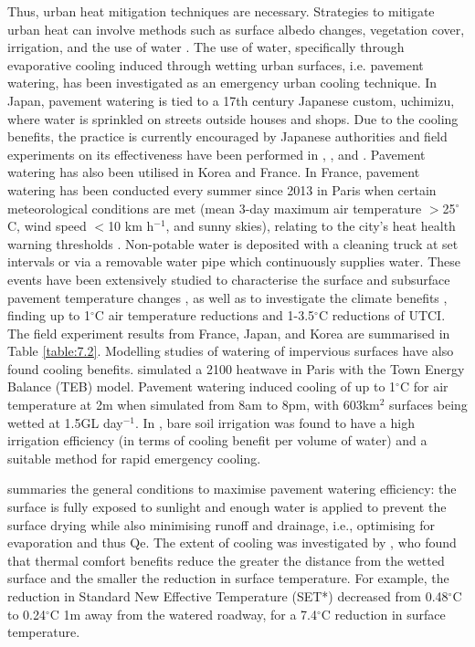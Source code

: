 \documentclass[final,3p,times,authoryear]{elsarticle}
\begin{document}
Thus, urban heat mitigation techniques are necessary. Strategies to mitigate urban heat can involve methods such as surface albedo changes, vegetation cover, irrigation, and the use of water \citep{Krayenhoff2021}. The use of water, specifically through evaporative cooling induced through wetting urban surfaces, i.e. pavement watering, has been investigated as an emergency urban cooling technique. In Japan, pavement watering is tied to a 17th century Japanese custom, uchimizu, where water is sprinkled on streets outside houses and shops. Due to the cooling benefits, the practice is currently encouraged by Japanese authorities \citep{Solcerova2018} and field experiments on its effectiveness have been performed in \cite{Kinouchi1997}, \cite{Himeno2010}, and \cite{Takebayashi2021}. Pavement watering has also been utilised in Korea \citep{Kim2014a,Kim2015,Na2021} and France. In France, pavement watering has been conducted every summer since 2013 in Paris when certain meteorological conditions are met (mean 3-day maximum air temperature $>$25$^{\circ}$C, wind speed $<$10 km h$^{-1}$, and sunny skies), relating to the city's heat health warning thresholds \citep{Pascal2006}. Non-potable water is deposited with a cleaning truck at set intervals or via a removable water pipe which continuously supplies water. These events have been extensively studied to characterise the surface and subsurface pavement temperature changes \citep{Hendel2015,Hendel2015a,Hendel2015b,Hendel2014}, as well as to investigate the climate benefits \citep{Hendel2016,Parison2020}, finding up to 1$^{\circ}$C air temperature reductions and 1-3.5$^{\circ}$C reductions of UTCI. The field experiment results from France, Japan, and Korea are summarised in Table \ref{table:7.2}. Modelling studies of watering of impervious surfaces have also found cooling benefits. \cite{Daniel2018} simulated a 2100 heatwave in Paris with the Town Energy Balance (TEB) model. Pavement watering induced cooling of up to 1$^{\circ}$C for air temperature at 2m when simulated from 8am to 8pm, with 603km$^{2}$ surfaces being wetted at 1.5GL day$^{-1}$. In \cite{Broadbent2018b}, bare soil irrigation was found to have a high irrigation efficiency (in terms of cooling benefit per volume of water) and a suitable method for rapid emergency cooling. 

\cite{Hendel2020} summaries the general conditions to maximise pavement watering efficiency: the surface is fully exposed to sunlight and enough water is applied to prevent the surface drying while also minimising runoff and drainage, i.e., optimising for evaporation and thus \gls{Qe}. The extent of cooling was investigated by \cite{Takebayashi2021}, who found that thermal comfort benefits reduce the greater the distance from the wetted surface and the smaller the reduction in surface temperature. For example, the reduction in Standard New Effective Temperature (SET*) decreased from 0.48$^{\circ}$C to 0.24$^{\circ}$C 1m away from the watered roadway, for a 7.4$^{\circ}$C reduction in surface temperature. 
\end{document}
